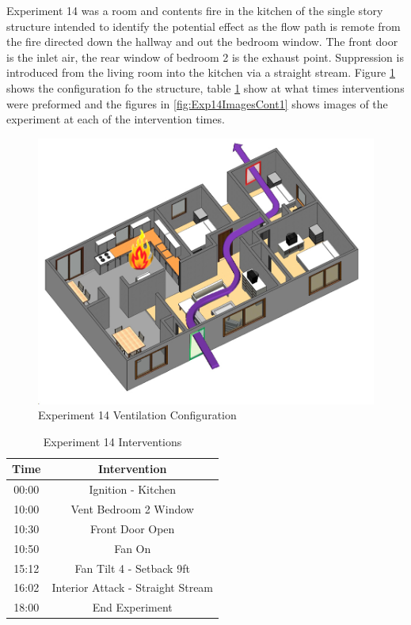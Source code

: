 \documentclass{article}
\begin{document}
Experiment 14 was a room and contents fire in the kitchen of the single story structure intended to identify the potential effect as the flow path is remote from the fire directed down the hallway and out the bedroom window. The front door is the inlet air, the rear window of bedroom 2 is the exhaust point. Suppression is introduced from the living room into the kitchen via a straight stream. Figure \ref{fig:Exp14VentConfig} shows the configuration fo the structure, table \ref{Table:Exp14Interventions} show at what times interventions were preformed and the figures in \ref{fig:Exp14ImagesCont1} shows images of the experiment at each of the intervention times.

\begin{figure}[h!]
	\centering
	\includegraphics[width=5in]{0_Images/FireExperiments/Single_Story/Experiment_14.jpg}
	\caption{Experiment 14 Ventilation Configuration}
	\label{fig:Exp14VentConfig}
\end{figure}

\begin{table}[H]
	\centering
	\caption{Experiment 14 Interventions}
	\begin{tabular}{|c|c|} 
		\hline
		Time & Intervention \\ \hline \hline
		00:00 & Ignition - Kitchen \\ \hline
		10:00 & Vent Bedroom 2 Window \\ \hline
		10:30 & Front Door Open \\ \hline
		10:50 & Fan On \\ \hline
		15:12 & Fan Tilt 4 - Setback 9ft \\ \hline
		16:02 & Interior Attack - Straight Stream \\ \hline
		18:00 & End Experiment \\ \hline
	\end{tabular}
	\label{Table:Exp14Interventions}
\end{table}
\end{document}

